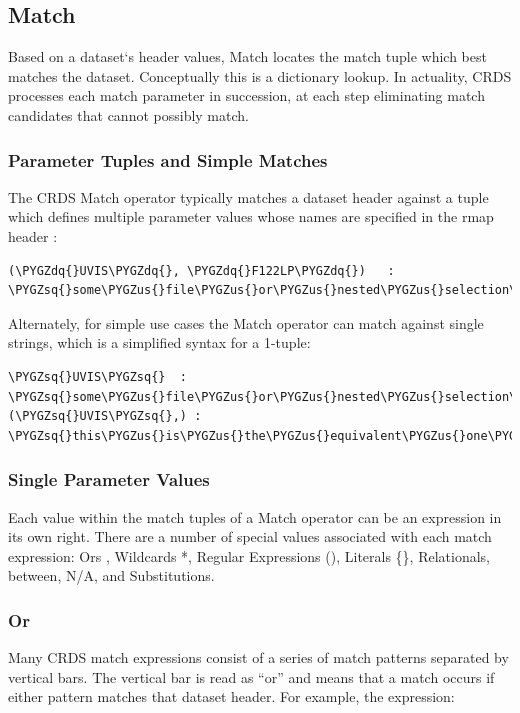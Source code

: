 \documentclass[letterpaper,10pt,english]{sphinxmanual}
\def\PYGZus{\char`\_}
\def\PYGZsq{\char`\'}
\def\PYGZdq{\char`\"}
\renewcommand\PYGZsq{\textquotesingle}
\begin{document}
\subsection{Match}
\label{rmap_syntax:match}
Based on a dataset{}`s header values,  Match locates the match tuple which best matches the dataset.   Conceptually this
is a dictionary lookup.   In actuality, CRDS processes each match parameter in succession,  at each step eliminating
match candidates that cannot possibly match.


\subsubsection{Parameter Tuples and Simple Matches}
\label{rmap_syntax:parameter-tuples-and-simple-matches}
The CRDS Match operator typically matches a dataset header against a tuple which defines multiple parameter values whose
names are specified in the rmap header :

\begin{Verbatim}[commandchars=\\\{\}]
(\PYGZdq{}UVIS\PYGZdq{}, \PYGZdq{}F122LP\PYGZdq{})   :  \PYGZsq{}some\PYGZus{}file\PYGZus{}or\PYGZus{}nested\PYGZus{}selection\PYGZsq{}
\end{Verbatim}

Alternately,  for simple use cases the Match operator can match against single
strings,  which is a simplified syntax for a 1-tuple:

\begin{Verbatim}[commandchars=\\\{\}]
\PYGZsq{}UVIS\PYGZsq{}  :  \PYGZsq{}some\PYGZus{}file\PYGZus{}or\PYGZus{}nested\PYGZus{}selection\PYGZsq{}
(\PYGZsq{}UVIS\PYGZsq{},) : \PYGZsq{}this\PYGZus{}is\PYGZus{}the\PYGZus{}equivalent\PYGZus{}one\PYGZus{}tuple\PYGZsq{}
\end{Verbatim}


\subsubsection{Single Parameter Values}
\label{rmap_syntax:single-parameter-values}
Each value within the match tuples of a Match operator can be an expression in its own right.   There are a number of
special values associated with each match expression:  Ors \textbar{}, Wildcards *,  Regular Expressions (), Literals \{\},
Relationals, between, N/A, and Substitutions.


\subsubsection{Or \textbar{}}
\label{rmap_syntax:or}
Many CRDS match expressions consist of a series of match patterns separated by vertical bars.   The vertical bar is read
as ``or'' and means that a match occurs if either pattern matches that dataset header.   For example, the expression:
\end{document}
